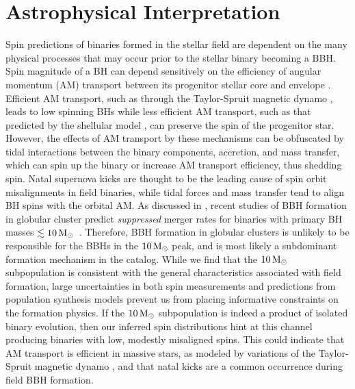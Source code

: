 \section{Astrophysical Interpretation} \label{sec:astro}


Spin predictions of binaries formed in the stellar field are dependent on the many physical processes that may occur prior to the stellar binary becoming a BBH.  Spin magnitude of a BH can depend sensitively on the efficiency of angular momentum (AM) transport between its progenitor stellar core and envelope \citep{2203.02515}. Efficient AM transport, such as through the Taylor-Spruit magnetic dynamo \citep{10.1051/0004-6361:20011465}, leads to low spinning BHs \citep{10.3847/2041-8213/ab339b} while less efficient AM transport, such as that predicted by the shellular model \citep{1992A&A...265..115Z,2012A&A...537A.146E,10.3847/1538-4365/aacb24,2019MNRAS.485.4641C}, can preserve the spin of the progenitor star. However, the effects of AM transport by these mechanisms can be obfuscated by tidal interactions between the binary components, accretion, and mass transfer, which can spin up the binary or increase AM transport efficiency, thus shedding spin. Natal supernova kicks are thought to be the leading cause of spin orbit misalignments in field binaries, while tidal forces and mass transfer tend to align BH spins with the orbital AM. As discussed in \citet{2111.03634}, recent studies of BBH formation in globular cluster predict \emph{suppressed} merger rates for binaries with primary BH masses $\lesssim 10 {\,\rm M}_\odot$~\citep{2009.01861,1906.10260,1808.04514}.  Therefore, BBH formation in globular clusters is unlikely to be responsible for the BBHs in the $10{\,\rm M}_\odot$ peak, and is most likely a subdominant formation mechanism in the catalog.
While we find that the $10{\,\rm M}_\odot$ subpopulation is consistent with the general characteristics associated with field formation, large uncertainties in both spin measurements and predictions from population synthesis models prevent us from placing informative constraints on the formation physics. If the $10{\,\rm M}_\odot$ subpopulation is indeed a product of isolated binary evolution, then our inferred spin distributions hint at this channel producing binaries with low, modestly misaligned spins. This could indicate that AM transport is efficient in massive stars, as modeled by variations of the Taylor-Spruit magnetic dynamo \citep{1706.07053}, and that natal kicks are a common occurrence during field BBH formation.

